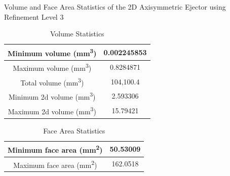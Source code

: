 \begin{frame}{Volume and Face Area Statistics of the 2D Axisymmetric Ejector using Refinement Level 3}
\begin{table}[h]
    \centering
    \caption{Volume Statistics}
    \label{tab:volumestat}
    \begin{tabular}{|c|c|}
      \hline
        Minimum volume (mm\textsuperscript3) &  0.002245853\\
     \hline
        Maximum volume (mm\textsuperscript3) & 0.8284871\\
     \hline
        Total volume (mm\textsuperscript3) & 104,100.4 \\
     \hline
        Minimum 2d volume (mm\textsuperscript3) & 2.593306 \\
     \hline
        Maximum 2d volume (mm\textsuperscript3) & 15.79421 \\
     \hline
    \end{tabular}
\end{table}
\begin{table}[h]
    \centering
    \caption{Face Area Statistics}
    \label{tab:faceareastat}
    \begin{tabular}{|c|c|}
       \hline
        Minimum face area (mm\textsuperscript2) & 50.53009  \\
       \hline
        Maximum face area (mm\textsuperscript2) & 162.0518 \\
       \hline
    \end{tabular}
\end{table}
\end{frame}

